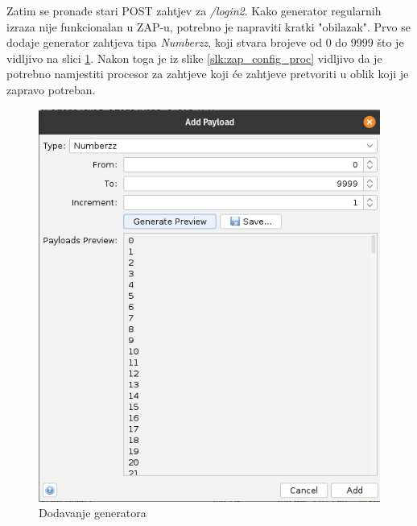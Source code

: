 Zatim se pronađe stari POST zahtjev za \textit{/login2}. Kako generator regularnih izraza nije funkcionalan u ZAP-u, potrebno je napraviti kratki "obilazak". Prvo se dodaje generator zahtjeva tipa \textit{Numberzz}, koji stvara brojeve od 0 do 9999 što je vidljivo na slici \ref{slk:zap_gen}. Nakon toga je iz slike \ref{slk:zap_config_proc} vidljivo da je potrebno namjestiti procesor za zahtjeve koji će zahtjeve pretvoriti u oblik koji je zapravo potreban.
\begin{figure}[H]
  \centering
  \begin{minipage}[b]{0.5\textwidth}
    \centering
    \includegraphics[width=\textwidth]{slike/payload_fuzz.png}
    \caption{Dodavanje generatora}
    \label{slk:zap_gen}
  \end{minipage}
  \hspace{0.05\textwidth} %
  \begin{minipage}[b]{0.4\textwidth}
    \centering

\end{minipage}
\end{figure}
